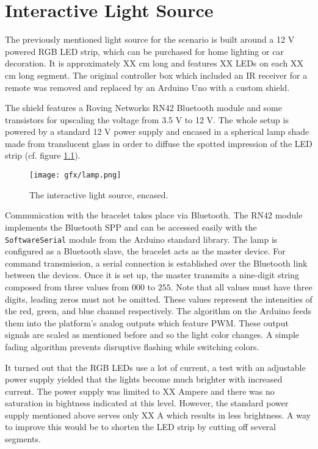 \chapter{Interactive Light Source}
\label{sec:lamp}

The previously mentioned light source for the scenario is built around a 12 V powered RGB \ac{LED} strip, which can be purchased for home lighting or car decoration. It is approximately XX cm long and features XX \ac{LED}s on each XX cm long segment. The original controller box which included an \ac{IR} receiver for a remote was removed and replaced by an Arduino Uno \cite{arduino_uno} with a custom shield. 

The shield features a Roving Networks RN42 Bluetooth module \cite{datasheet_rn42} and some transistors for upscaling the voltage from 3.5 V to 12 V. The whole setup is powered by a standard 12 V power supply and encased in a spherical lamp shade made from translucent glass in order to diffuse the spotted impression of the LED strip (cf. figure \ref{fig:lamp}).

\begin{figure}[bth]
	\begin{center}
		\texttt{[image: gfx/lamp.png]}
	\end{center}
	\label{fig:lamp}
	\caption{The interactive light source, encased.}
\end{figure} 

Communication with the bracelet takes place via Bluetooth. The RN42 module implements the Bluetooth \ac{SPP} and can be accessed easily with the \texttt{SoftwareSerial} module from the Arduino standard library. The lamp is configured as a Bluetooth slave, the bracelet acts as the master device. For command transmission, a serial connection is established over the Bluetooth link between the devices. Once it is set up, the master transmits a nine-digit string composed from three values from $000$ to $255$. Note that all values must have three digits, leading zeros must not be omitted. These values represent the intensities of the red, green, and blue channel respectively. The algorithm on the Arduino feeds them into the platform's analog outputs which feature \ac{PWM}. These output signals are scaled as mentioned before and so the light color changes. A simple fading algorithm prevents disruptive flashing while switching colors.

It turned out that the RGB \ac{LED}s use a lot of current, a test with an adjustable power supply yielded that the lights become much brighter with increased current. The power supply was limited to XX Ampere and there was no saturation in bightness indicated at this level. However, the standard power supply mentioned above serves only XX A which results in less brightness. A way to improve this would be to shorten the \ac{LED} strip by cutting off several segments.